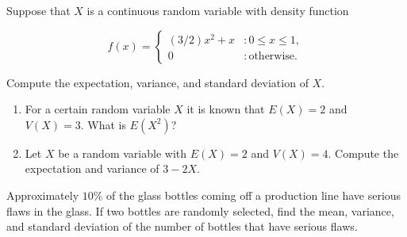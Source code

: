 \documentclass[12pt,reqno]{amsart}
\begin{document}
\bigskip
\prob Suppose that $X$ is a continuous random variable with density function
	
	\[
	f(x) = \begin{cases}
	(3/2)x^2 + x & : 0\leq x \leq 1, \\
	0 & : \text{otherwise}.
	\end{cases}
	\]

Compute the expectation, variance, and standard deviation of $X$.\vfill














\newpage
\prob

\begin{enumerate}
\item For a certain random variable $X$ it is known that $E(X)=2$ and $V(X) = 3$. What is $E(X^2)$?\vfill
\item Let $X$ be a random variable with $E(X)=2$ and $V(X)=4$. Compute the expectation and variance of $3-2X$.\vfill
\end{enumerate}















\bigskip
\prob Approximately $10\%$ of the glass bottles coming off a production line have serious flaws in the glass. If two bottles are randomly selected, find the mean, variance, and standard deviation of the number of bottles that have serious flaws.\vfill
\end{document}
